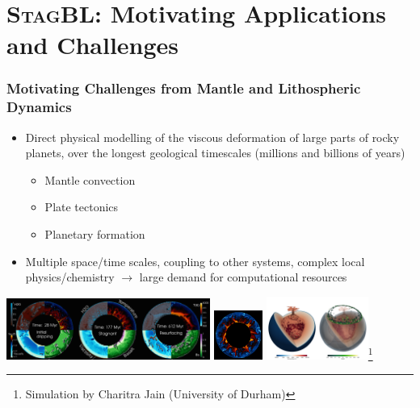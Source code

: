 \documentclass{beamer}
\newcommand{\StagBL}{\textsc{StagBL}}
\begin{document}
\section{\StagBL{}: Motivating Applications and Challenges}

\begin{frame}[fragile]
\frametitle{Motivating Challenges from Mantle and Lithospheric Dynamics}
\begin{itemize}
\item Direct physical modelling of the viscous deformation of large parts of rocky planets, over the longest geological timescales (millions and billions of years)
\begin{itemize}
\item Mantle convection
\item Plate tectonics
\item Planetary formation
\end{itemize}
\item Multiple space/time scales, coupling to other systems, complex local physics/chemistry $\rightarrow$ large demand for computational resources
\end{itemize}
  \begin{center}

    \includegraphics[width=0.5\textwidth]{images/rozel.jpg}
    \includegraphics[width=0.12\textwidth]{images/frame_00030049_cut.png}
    \includegraphics[width=0.25\textwidth]{images/YY-step60-BluRed_lowres.png}\footnote{Simulation by Charitra Jain (University of Durham)}
  \end{center}

\end{frame}
\end{document}
